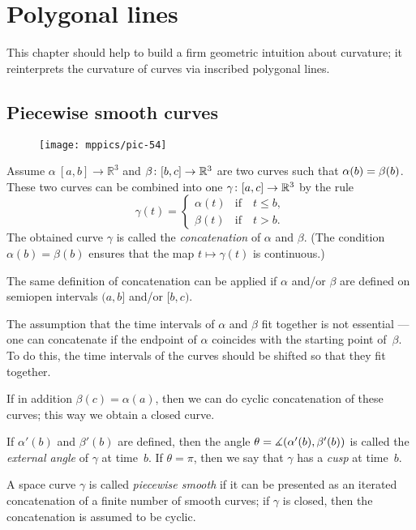\chapter{Polygonal lines}
\label{chap:poly}

This chapter should help to build a firm geometric intuition about curvature;
it reinterprets the curvature of curves via inscribed polygonal lines.

\section{Piecewise smooth curves}

\begin{wrapfigure}{o}{25 mm}
\vskip-0mm
\centering
\texttt{[image: mppics/pic-54]}
\end{wrapfigure}

Assume $\alpha\:[a,b]\to \mathbb{R}^3$ and $\beta\:[b,c]\z\to \mathbb{R}^3$ are two curves such that $\alpha(b)\z=\beta(b)$.
These two curves can be combined into one $\gamma\:[a,c]\z\to \mathbb{R}^3$ by the rule 
\[\gamma(t)=
\begin{cases}
\alpha(t)&\text{if}\quad t\le b,
\\
\beta(t)&\text{if}\quad t> b.
\end{cases}
\]
The obtained curve $\gamma$ is called the 
\emph{concatenation} of $\alpha$ and $\beta$.
(The condition $\alpha(b)=\beta(b)$ ensures that the map $t\mapsto\gamma(t)$ is continuous.)

The same definition of concatenation can be applied if $\alpha$ and/or $\beta$ are defined on semiopen intervals 
$(a,b]$ and/or $[b,c)$.

The assumption that the time intervals of $\alpha$ and $\beta$ fit together is not essential --- one can concatenate if the endpoint of $\alpha$ coincides with the starting point of~$\beta$.
To do this, the time intervals of the curves should be shifted so that they fit together. 

If in addition $\beta(c)=\alpha(a)$, then we can do cyclic concatenation of these curves;
this way we obtain a closed curve.

If $\alpha'(b)$ and $\beta'(b)$ are defined, then the angle $\theta\z=\measuredangle(\alpha'(b),\beta'(b))$ is called the \emph{external angle} of $\gamma$ at time~$b$.
If $\theta=\pi$, then we say that $\gamma$ has a \emph{cusp} at  time~$b$.

A space curve $\gamma$ is called \emph{piecewise smooth} if it can be presented as an iterated concatenation of a finite number of smooth curves; if $\gamma$ is closed, then the  concatenation is assumed to be cyclic.

